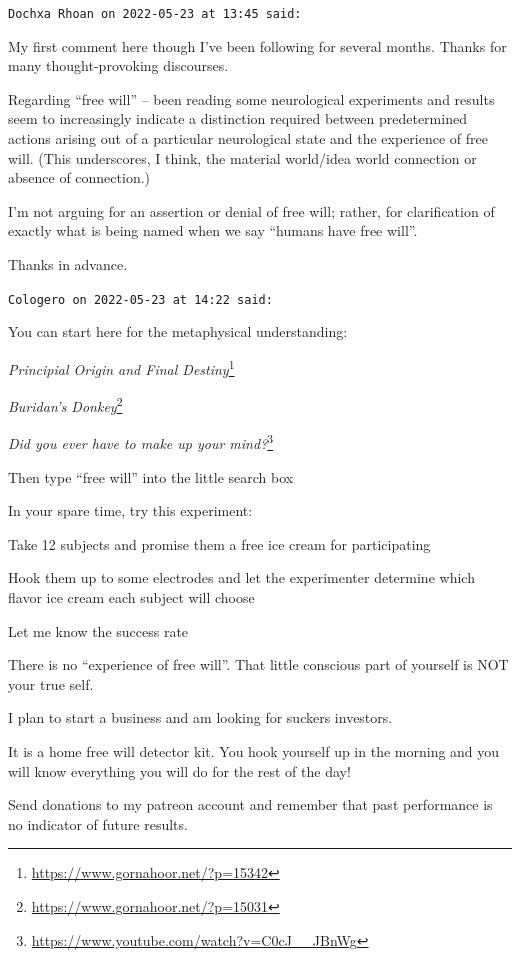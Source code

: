 \begin{footnotesize}
\begin{sffamily}
\texttt{Dochxa Rhoan on 2022-05-23 at 13:45 said:}

My first comment here though I've been following for several months. Thanks for many thought-provoking discourses.

Regarding ``free will'' -- been reading some neurological experiments and results seem to increasingly indicate a distinction required between predetermined actions arising out of a particular neurological state and the experience of free will. (This underscores, I think, the material world/idea world connection or absence of connection.)

I'm not arguing for an assertion or denial of free will; rather, for clarification of exactly what is being named when we say ``humans have free will''.

Thanks in advance.

\hfill

\texttt{Cologero on 2022-05-23 at 14:22 said:}

You can start here for the metaphysical understanding:

\textit{Principial Origin and Final Destiny}\footnote{\url{https://www.gornahoor.net/?p=15342}}

\textit{Buridan's Donkey}\footnote{\url{https://www.gornahoor.net/?p=15031}}

\textit{Did you ever have to make up your mind?}\footnote{\url{https://www.youtube.com/watch?v=C0cJ__JBnWg}}

Then type ``free will'' into the little search box

In your spare time, try this experiment:

Take 12 subjects and promise them a free ice cream for participating

Hook them up to some electrodes and let the experimenter determine which flavor ice cream each subject will choose

Let me know the success rate

There is no ``experience of free will''. That little conscious part of yourself is NOT your true self.

I plan to start a business and am looking for suckers investors.

It is a home free will detector kit. You hook yourself up in the morning and you will know everything you will do for the rest of the day!

Send donations to my patreon account and remember that past performance is no indicator of future results.


\end{sffamily}
\end{footnotesize}
